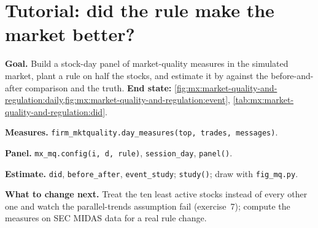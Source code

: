 \begin{omfigure}

\label{fig:mx:market-quality-and-regulation:event}
\end{omfigure}

\section{Tutorial: did the rule make the market better?}\label{tut:mx:market-quality-and-regulation:tut}

\begin{tutorial}
\textbf{Goal.} Build a stock-day panel of market-quality measures in the simulated market, plant a rule on half the stocks, and estimate it by
 against the before-and-after comparison and the truth.
\textbf{End state:} \cref{fig:mx:market-quality-and-regulation:daily,fig:mx:market-quality-and-regulation:event},
\cref{tab:mx:market-quality-and-regulation:did}.
\begin{tutsteps}
\item \textbf{Measures.} \texttt{firm\_mktquality.day\_measures(top, trades, messages)}.
\item \textbf{Panel.} \texttt{mx\_mq.config(i, d, rule)}, \texttt{session\_day}, \texttt{panel()}.
\item \textbf{Estimate.} \texttt{did}, \texttt{before\_after}, \texttt{event\_study}; \texttt{study()}; draw with \texttt{fig\_mq.py}.
\end{tutsteps}
\textbf{What to change next.} Treat the ten least active stocks instead of every other one and watch the parallel-trends assumption fail
(exercise~7); compute the measures on SEC MIDAS data for a real rule change.
\end{tutorial}

